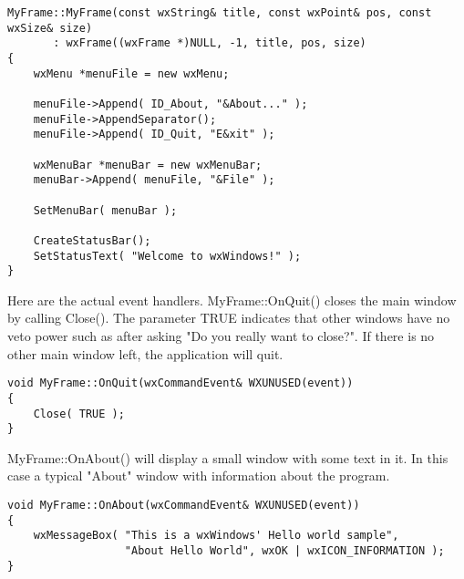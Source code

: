 \begin{verbatim}
MyFrame::MyFrame(const wxString& title, const wxPoint& pos, const wxSize& size)
       : wxFrame((wxFrame *)NULL, -1, title, pos, size)
{
    wxMenu *menuFile = new wxMenu;

    menuFile->Append( ID_About, "&About..." );
    menuFile->AppendSeparator();
    menuFile->Append( ID_Quit, "E&xit" );

    wxMenuBar *menuBar = new wxMenuBar;
    menuBar->Append( menuFile, "&File" );

    SetMenuBar( menuBar );

    CreateStatusBar();
    SetStatusText( "Welcome to wxWindows!" );
}
\end{verbatim}

Here are the actual event handlers. MyFrame::OnQuit() closes the main window
by calling Close(). The parameter TRUE indicates that other windows have no veto
power such as after asking "Do you really want to close?". If there is no other 
main window left, the application will quit.

\begin{verbatim}
void MyFrame::OnQuit(wxCommandEvent& WXUNUSED(event))
{
    Close( TRUE );
}
\end{verbatim}

MyFrame::OnAbout() will display a small window with some text in it. In this
case a typical "About" window with information about the program.

\begin{verbatim}
void MyFrame::OnAbout(wxCommandEvent& WXUNUSED(event))
{
    wxMessageBox( "This is a wxWindows' Hello world sample",
                  "About Hello World", wxOK | wxICON_INFORMATION );
}
\end{verbatim}

